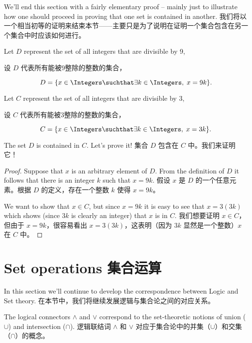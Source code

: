 We'll end this section with a fairly elementary proof -- mainly just to
illustrate how one should proceed in proving that one  set is contained in
another.
我们将以一个相当初等的证明来结束本节——主要只是为了说明在证明一个集合包含在另一个集合中时应该如何进行。

Let $D$ represent the set of all integers that are divisible by 9,

设 $D$ 代表所有能被9整除的整数的集合，

\[ D = \{ x \in \Integers \suchthat \exists k \in \Integers, \; x=9k \}. \]

Let $C$ represent the set of all integers that are divisible by 3,

设 $C$ 代表所有能被3整除的整数的集合，

\[ C = \{ x \in \Integers \suchthat \exists k \in \Integers, \; x=3k \}. \]
 
The set $D$ is contained in $C$.  Let's prove
it!
集合 $D$ 包含在 $C$ 中。我们来证明它！
\begin{proof}
Suppose that $x$ is an arbitrary element of $D$.  From the definition
of $D$ it follows that there is an integer $k$ such that $x=9k$.
假设 $x$ 是 $D$ 的一个任意元素。根据 $D$ 的定义，存在一个整数 $k$ 使得 $x=9k$。

We want to show that $x \in C$, but since $x=9k$ it is easy to 
see that $x = 3(3k)$ which shows (since $3k$ is clearly an integer)
that $x$ is in $C$.
我们想要证明 $x \in C$，但由于 $x=9k$，很容易看出 $x = 3(3k)$，这表明（因为 $3k$ 显然是一个整数）$x$ 在 $C$ 中。
\end{proof}

\clearpage 




\newpage

\section{Set operations 集合运算}
\label{sec:set_ops}

In this section we'll continue to develop the correspondence between 
Logic and Set theory.
在本节中，我们将继续发展逻辑与集合论之间的对应关系。

The logical connectors $\land$ and $\lor$ correspond to the set-theoretic
notions of 
union ($\cup$) and 
intersection ($\cap$).
逻辑联结词 $\land$ 和 $\lor$ 对应于集合论中的并集（$\cup$）和交集（$\cap$）的概念。

